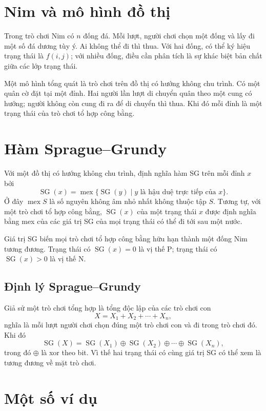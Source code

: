 \documentclass[11pt]{article}
\newcommand{\mex}{\operatorname{mex}}
\newcommand{\SG}{\operatorname{SG}}
\begin{document}
\section{Nim và mô hình đồ thị}

Trong trò chơi Nim có \(n\) đống đá. Mỗi lượt, người chơi chọn một đống và
lấy đi một số đá dương tùy ý. Ai không thể đi thì thua. Với hai đống, có thể
ký hiệu trạng thái là \(f(i,j)\); với nhiều đống, điều cần phân tích là sự
khác biệt bản chất giữa các lớp trạng thái.

Một mô hình tổng quát là trò chơi trên đồ thị có hướng không chu trình. Có
một quân cờ đặt tại một đỉnh. Hai người lần lượt di chuyển quân theo một cung
có hướng; người không còn cung đi ra để di chuyển thì thua. Khi đó mỗi đỉnh là
một trạng thái của trò chơi tổ hợp công bằng.

\section{Hàm Sprague--Grundy}

Với một đồ thị có hướng không chu trình, định nghĩa hàm SG trên mỗi đỉnh
\(x\) bởi
\[
  \SG(x)=\mex\{\SG(y)\mid y \text{ là hậu duệ trực tiếp của }x\}.
\]
Ở đây \(\mex S\) là số nguyên không âm nhỏ nhất không thuộc tập \(S\).
Tương tự, với một trò chơi tổ hợp công bằng, \(\SG(x)\) của một trạng thái
\(x\) được định nghĩa bằng mex của các giá trị SG của mọi trạng thái có thể
đi tới sau một nước.

Giá trị SG biến mọi trò chơi tổ hợp công bằng hữu hạn thành một đống Nim
tương đương. Trạng thái có \(\SG(x)=0\) là vị thế P; trạng thái có
\(\SG(x)>0\) là vị thế N.

\subsection{Định lý Sprague--Grundy}

Giả sử một trò chơi tổng hợp là tổng độc lập của các trò chơi con
\[
  X=X_1+X_2+\cdots+X_n,
\]
nghĩa là mỗi lượt người chơi chọn đúng một trò chơi con và đi trong trò chơi
đó. Khi đó
\[
  \SG(X)=\SG(X_1)\oplus \SG(X_2)\oplus\cdots\oplus \SG(X_n),
\]
trong đó \(\oplus\) là xor theo bit. Vì thế hai trạng thái có cùng giá trị SG
có thể xem là tương đương về mặt trò chơi.

\section{Một số ví dụ}
\end{document}
